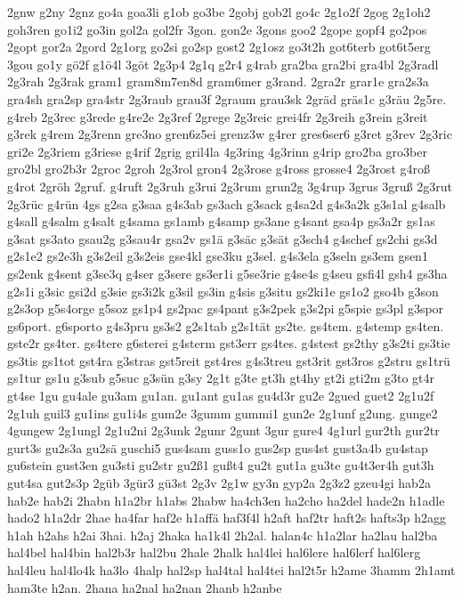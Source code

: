 {2gnw
g2ny
2gnz
go4a
goa3li
g1ob
go3be
2gobj
gob2l
go4c
2g1o2f
2gog
2g1oh2
goh3ren
go1i2
go3in
gol2a
gol2fr
3gon.
gon2e
3gons
goo2
2gope
gopf4
go2pos
2gopt
gor2a
2gord
2g1org
go2si
go2sp
gost2
2g1osz
go3t2h
got6terb
got6t5erg
3gou
go1y
gö2f
g1ö4l
3göt
2g3p4
2g1q
g2r4
g4rab
gra2ba
gra2bi
gra4bl
2g3radl
2g3rah
2g3rak
gram1
gram8m7en8d
gram6mer
g3rand.
2gra2r
grar1e
gra2s3a
gra4sh
gra2sp
gra4str
2g3raub
grau3f
2graum
grau3sk
2gräd
gräs1c
g3räu
2g5re.
g4reb
2g3rec
g3rede
g4re2e
2g3ref
2grege
2g3reic
grei4fr
2g3reih
g3rein
g3reit
g3rek
g4rem
2g3renn
gre3no
gren6z5ei
grenz3w
g4rer
gres6ser6
g3ret
g3rev
2g3ric
gri2e
2g3riem
g3riese
g4rif
2grig
gril4la
4g3ring
4g3rinn
g4rip
gro2ba
gro3ber
gro2bl
gro2b3r
2groc
2groh
2g3rol
gron4
2g3rose
g4ross
grosse4
2g3rost
g4roß
g4rot
2gröh
2gruf.
g4ruft
2g3ruh
g3rui
2g3rum
grun2g
3g4rup
3grus
3gruß
2g3rut
2g3rüc
g4rün
4gs
g2sa
g3saa
g4s3ab
gs3ach
g3sack
g4sa2d
g4s3a2k
g3s1al
g4salb
g4sall
g4salm
g4salt
g4sama
gs1amb
g4samp
gs3ane
g4sant
gsa4p
gs3a2r
gs1as
g3sat
gs3ato
gsau2g
g3sau4r
gsa2v
gs1ä
g3säc
g3sät
g3sch4
g4schef
gs2chi
gs3d
g2s1e2
gs2e3h
g3s2eil
g3s2eis
gse4kl
gse3ku
g3sel.
g4s3ela
g3seln
gs3em
gsen1
gs2enk
g4sent
g3se3q
g4ser
g3sere
gs3er1i
g5se3rie
g4se4s
g4seu
gsfi4l
gsh4
gs3ha
g2s1i
g3sic
gsi2d
g3sie
gs3i2k
g3sil
gs3in
g4sis
g3situ
gs2ki1e
gs1o2
gso4b
g3son
g2s3op
g5s4orge
g5soz
gs1p4
gs2pac
gs4pant
g3s2pek
g3s2pi
g5spie
gs3pl
g3spor
gs6port.
g6sporto
g4s3pru
gs3s2
g2s1tab
g2s1tät
gs2te.
gs4tem.
g4stemp
gs4ten.
gste2r
gs4ter.
gs4tere
g6sterei
g4sterm
gst3err
gs4tes.
g4stest
gs2thy
g3s2ti
gs3tie
gs3tis
gs1tot
gst4ra
g3stras
gst5reit
gst4res
g4s3treu
gst3rit
gst3ros
g2stru
gs1trü
gs1tur
gs1u
g3sub
g5suc
g3sün
g3sy
2g1t
g3te
gt3h
gt4hy
gt2i
gti2m
g3to
gt4r
gt4se
1gu
gu4ale
gu3am
gu1an.
gu1ant
gu1as
gu4d3r
gu2e
2gued
guet2
2g1u2f
2g1uh
guil3
gu1ins
gu1i4s
gum2e
3gumm
gummi1
gun2e
2g1unf
g2ung.
gunge2
4gungew
2g1ungl
2g1u2ni
2g3unk
2gunr
2gunt
3gur
gure4
4g1url
gur2th
gur2tr
gurt3s
gu2s3a
gu2sä
guschi5
gus4sam
guss1o
gus2sp
gus4st
gust3a4b
gu4stap
gu6stein
gust3en
gu3sti
gu2str
gu2ß1
gußt4
gu2t
gut1a
gu3te
gu4t3er4h
gut3h
gut4sa
gut2s3p
2güb
3gür3
gü3st
2g3v
2g1w
gy3n
gyp2a
2g3z2
gzeu4gi
hab2a
hab2e
hab2i
2habn
h1a2br
h1abs
2habw
ha4ch3en
ha2cho
ha2del
hade2n
h1adle
hado2
h1a2dr
2hae
ha4far
haf2e
h1affä
haf3f4l
h2aft
haf2tr
haft2s
hafts3p
h2agg
h1ah
h2ahs
h2ai
3hai.
h2aj
2haka
ha1k4l
2h2al.
halan4c
h1a2lar
ha2lau
hal2ba
hal4bel
hal4bin
hal2b3r
hal2bu
2hale
2halk
hal4lei
hal6lere
hal6lerf
hal6lerg
hal4leu
hal4lo4k
ha3lo
4halp
hal2sp
hal4tal
hal4tei
hal2t5r
h2ame
3hamm
2h1amt
ham3te
h2an.
2hana
ha2nal
ha2nan
2hanb
h2anbe
}
